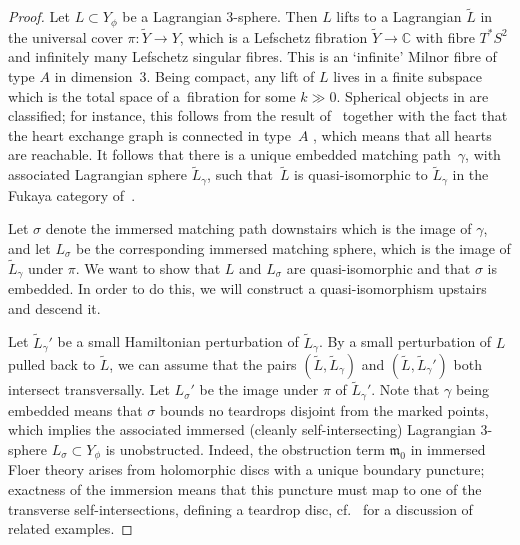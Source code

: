 \documentclass[pdftex]{sigma}
\def\bC{\mathbb{C}}
\theoremstyle{definition}
\numberwithin{equation}{section}
\begin{document}
\begin{proof}
Let $L \subset Y_{\phi}$ be a Lagrangian $3$-sphere. Then $L$ lifts to a Lagrangian $\tilde{L}$ in the universal cover $\pi\colon \tilde{Y} \to Y$, which is a Lefschetz fibration $\tilde{Y} \to \bC$ with fibre $T^*S^2$ and infinitely many Lefschetz singular fibres.
This is an `infinite' Milnor fibre of type $A$ in dimension~3.
Being compact, any lift of $L$ lives in a finite subspace which is the total space of a~fibration  for some $k\gg 0$.
Spherical objects in  are classified; for instance, this follows from the result of~\cite{King-QiuYu} together with the fact that the heart exchange graph is connected in type~$A$ \cite{Ikeda}, which means that all hearts are reachable.
It follows that there is a unique embedded matching path~$\gamma$, with associated Lagrangian sphere $\tilde{L}_\gamma$, such that~$\tilde{L}$ is quasi-isomorphic to $\tilde{L}_\gamma$ in the Fukaya category of~.

Let $\sigma$ denote the immersed matching path downstairs which is the image of $\gamma$, and let $L_\sigma$ be the corresponding immersed matching sphere, which is the image of $\tilde{L}_\gamma$ under $\pi$. We want to show that $L$ and $L_\sigma$ are quasi-isomorphic and that $\sigma$ is embedded. In order to do this, we will construct a quasi-isomorphism upstairs and descend it.

Let $\tilde{L}_\gamma'$ be a small Hamiltonian perturbation of $\tilde{L}_\gamma$.
By a small perturbation of $L$ pulled back to $\tilde{L}$, we can assume that the pairs $(\tilde{L}, \tilde{L}_\gamma )$
and $(\tilde{L}, \tilde{L}_\gamma')$ both intersect transversally.
Let $L_\sigma'$ be the image under $\pi$ of $\tilde{L}_\gamma'$.
Note that $\gamma$ being embedded means that $\sigma$ bounds no teardrops disjoint from the marked points, which implies the associated immersed (cleanly self-intersecting) Lagrangian 3-sphere $L_{\sigma} \subset Y_{\phi}$ is unobstructed. Indeed, the obstruction term $\mathfrak{m}_0$ in immersed Floer theory arises from holomorphic discs with a unique boundary puncture; exactness of the immersion means that this puncture must map to one of the transverse self-intersections, defining a teardrop disc, cf.~\cite[Section 13.3]{Akaho-Joyce} for a discussion of related examples.


\end{proof}
\end{document}
